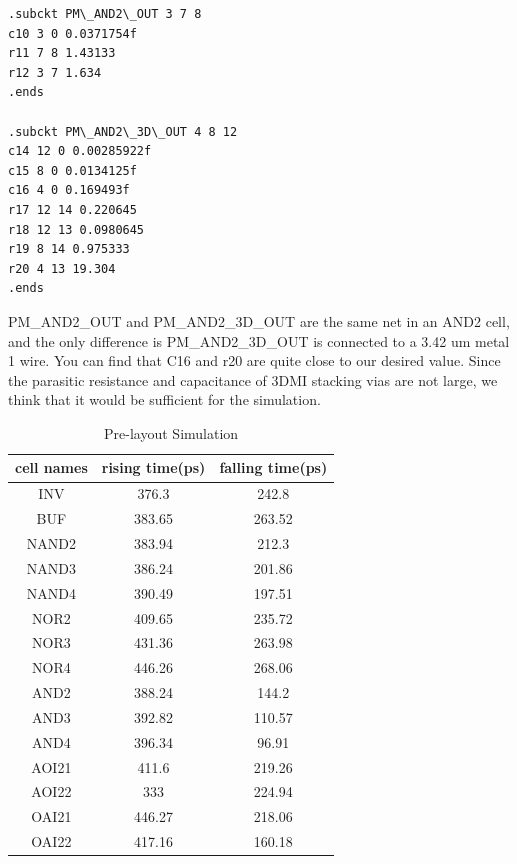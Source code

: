 \documentclass{article}
\begin{document}
\begin{verbatim}
.subckt PM\_AND2\_OUT 3 7 8
c10 3 0 0.0371754f
r11 7 8 1.43133
r12 3 7 1.634
.ends

.subckt PM\_AND2\_3D\_OUT 4 8 12
c14 12 0 0.00285922f
c15 8 0 0.0134125f
c16 4 0 0.169493f  
r17 12 14 0.220645
r18 12 13 0.0980645
r19 8 14 0.975333
r20 4 13 19.304   
.ends
\end{verbatim}


  PM\_AND2\_OUT and PM\_AND2\_3D\_OUT are the same net in an AND2 cell, and the only difference is PM\_AND2\_3D\_OUT is connected to a 3.42 um metal 1 wire. You can find that C16 and r20 are quite close to our desired value. Since the parasitic resistance and capacitance of 3DMI stacking vias are not large, we think that it would be sufficient for the simulation.

\begin{table}
\centering
\begin{tabular}{|c|c|c|} 
\hline
cell names&rising time(ps)&falling time(ps) \\ \hline
INV&376.3&242.8 \\ \hline
BUF&383.65&263.52 \\ \hline
NAND2&383.94&212.3 \\ \hline
NAND3&386.24&201.86 \\ \hline
NAND4&390.49&197.51 \\ \hline
NOR2&409.65&235.72 \\ \hline
NOR3&431.36&263.98 \\ \hline
NOR4&446.26&268.06 \\ \hline
AND2&388.24&144.2 \\ \hline
AND3&392.82&110.57 \\ \hline
AND4&396.34&96.91 \\ \hline
AOI21&411.6&219.26 \\ \hline
AOI22&333&224.94 \\ \hline
OAI21&446.27&218.06 \\ \hline
OAI22&417.16&160.18 \\ \hline
\end{tabular}
\caption{Pre-layout Simulation}
\label{tab:prelayout}
\end{table}
\end{document}
